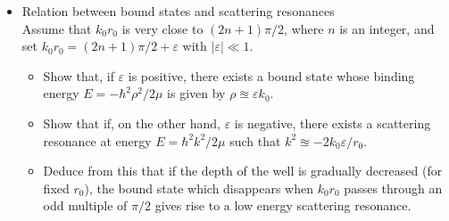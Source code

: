 \documentclass[10pt,a4paper]{article}
\newenvironment{problem}[2][Problem]{\begin{trivlist}
\item[\hskip \labelsep {\bfseries #1}\hskip \labelsep {\bfseries #2.}]}{\end{trivlist}}
\begin{document}
\begin{problem}{4}
\begin{itemize}
\begin{itemize}
\end{itemize}
\item[(c)] Relation between bound states and scattering resonances\\
Assume that $k_0r_0$ is very close to $(2n+1)\pi/2$, where $n$ is an integer, and set $k_0r_0=(2n+1)\pi/2+\varepsilon$ with $|\varepsilon|\ll1$.
\begin{itemize}
\item[i.] Show that, if $\varepsilon$ is positive, there exists a bound state whose binding energy $E=-\hbar^2\rho^2/2\mu$ is given by $\rho\approxeq\varepsilon k_0$.
\item[ii.] Show that if, on the other hand, $\varepsilon$ is negative, there exists a scattering resonance at energy $E=\hbar^2k^2/2\mu$ such that $k^2\approxeq-2k_0\varepsilon/r_0$.
\item[iii.] Deduce from this that if the depth of the well is gradually decreased (for fixed $r_0$), the bound state which disappears when $k_0r_0$ passes through an odd multiple of $\pi/2$ gives rise to a low energy scattering resonance.
\end{itemize}
\end{itemize}
\end{problem}
\end{document}

